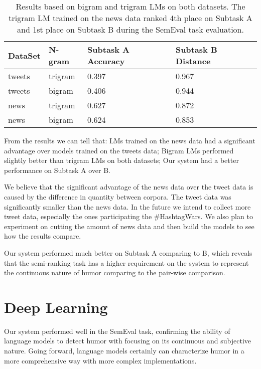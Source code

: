 \documentclass[11pt,a4paper]{article}
\begin{document}
\begin{table}[h]
\begin{center}
\begin{tabular}{ |p{1.2cm}|p{1.2cm}|p{1.7cm}|p{1.7cm}|}
\hline
DataSet & N-gram & Subtask A Accuracy & Subtask B Distance \\
\hline
tweets & trigram & 0.397 & 0.967 \\
\hline
tweets & bigram & 0.406 & 0.944 \\
\hline
news & trigram & 0.627 & 0.872 \\
\hline
news & bigram & 0.624 & 0.853 \\
\hline
\end{tabular}
\caption{Results based on bigram and trigram LMs on both datasets. The trigram LM trained on the news data ranked 4th place on Subtask A and 1st place on Subtask B during the SemEval task evaluation.}
\end{center}
\end{table}

From the results we can tell that: LMs trained on the news data had a significant advantage over models trained on the tweets data; Bigram LMs performed slightly better than trigram LMs on both datasets; Our system had a better performance on Subtask A over B.

We believe that the significant advantage of the news data over the tweet data is caused by the difference in quantity between corpora. The tweet data was significantly smaller than the news data. In the future we intend to collect more tweet data, especially the ones participating the \#HashtagWars. We also plan to experiment on cutting the amount of news data and then build the models to see how the results compare.

Our system performed much better on Subtask A comparing to B, which reveals that the semi-ranking task has a higher requirement on the system to represent the continuous nature of humor comparing to the pair-wise comparison.

\section{Deep Learning}
Our system performed well in the SemEval task, confirming the ability of language models to detect humor with focusing on its continuous and subjective nature. Going forward, language models certainly can characterize humor in a more comprehensive way with more complex implementations.
\end{document}
